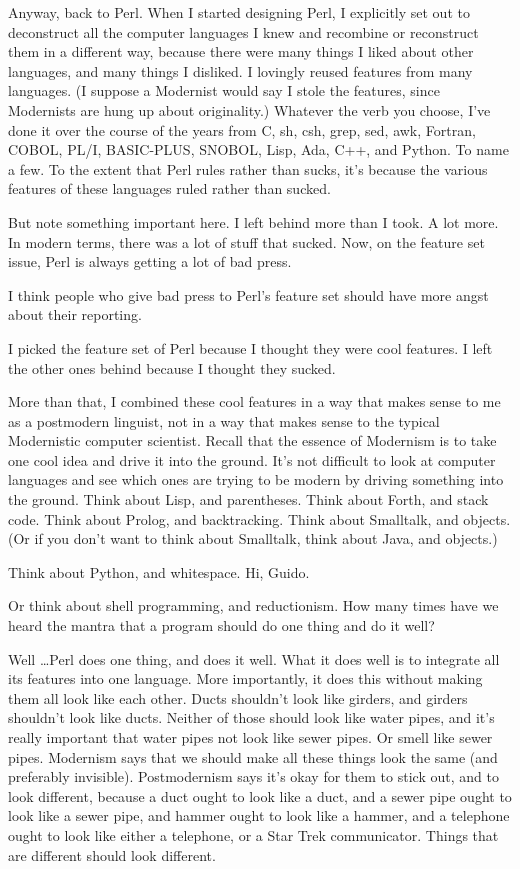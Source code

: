 \documentclass[10pt,letterpaper]{article}
\newcommand{\acro}[1]{{\small\MakeUppercase #1\spacefactor1000}}
\begin{document}
Anyway, back to Perl. When I started designing Perl, I explicitly set out to
deconstruct all the computer languages I knew and recombine or reconstruct
them in a different way, because there were many things I liked about other
languages, and many things I disliked. I lovingly reused features from many
languages. (I suppose a Modernist would say I stole the features, since
Modernists are hung up about originality.) Whatever the verb you choose, I've
done it over the course of the years from C, sh, csh, grep, sed, awk,
Fortran, \acro{COBOL}, \acro{PL/I}, \acro{BASIC-PLUS}, \acro{SNOBOL}, Lisp,
Ada, C++, and Python. To name
a few. To the extent that Perl rules rather than sucks, it's because the
various features of these languages ruled rather than sucked.

But note something important here. I left behind more than I took. A lot
more. In modern terms, there was a lot of stuff that sucked. Now, on the
feature set issue, Perl is always getting a lot of bad press.

I think people who give bad press to Perl's feature set should have more
angst about their reporting.

I picked the feature set of Perl because I thought they were cool features. I
left the other ones behind because I thought they sucked.

More than that, I combined these cool features in a way that makes sense to
me as a postmodern linguist, not in a way that makes sense to the typical
Modernistic computer scientist. Recall that the essence of Modernism is to
take one cool idea and drive it into the ground. It's not difficult to look
at computer languages and see which ones are trying to be modern by driving
something into the ground. Think about Lisp, and parentheses. Think about
Forth, and stack code. Think about Prolog, and backtracking. Think about
Smalltalk, and objects. (Or if you don't want to think about Smalltalk, think
about Java, and objects.)

Think about Python, and whitespace. Hi, Guido.

Or think about shell programming, and reductionism. How many times have we
heard the mantra that a program should do one thing and do it well?

Well \ldots Perl does one thing, and does it well. What it does well is to
integrate all its features into one language. More importantly, it does this
without making them all look like each other. Ducts shouldn't look like
girders, and girders shouldn't look like ducts. Neither of those should look
like water pipes, and it's really important that water pipes not look like
sewer pipes. Or smell like sewer pipes. Modernism says that we should make
all these things look the same (and preferably invisible). Postmodernism says
it's okay for them to stick out, and to look different, because a duct ought
to look like a duct, and a sewer pipe ought to look like a sewer pipe, and
hammer ought to look like a hammer, and a telephone ought to look like either
a telephone, or a Star Trek communicator. Things that are different should
look different.
\end{document}
